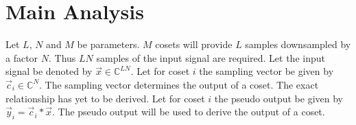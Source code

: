 \documentclass[a4paper, openany, oneside]{memoir}
\begin{document}
\section{Main Analysis}

Let $L$, $N$ and $M$ be parameters. $M$ cosets will provide $L$ samples downsampled by a factor $N$. Thus $LN$ samples of the input signal are required. Let the input signal be denoted by $\vec{x} \in \mathbb{C}^{LN}$. Let for coset $i$ the sampling vector be given by $\vec{c}_i \in \mathbb{C}^{N}$. The sampling vector determines the output of a coset. The exact relationship has yet to be derived. Let for coset $i$ the pseudo output be given by $\vec{y}_i = \vec{c}_i \ast \vec{x}$. The pseudo output will be used to derive the output of a coset.

\begin{blockTheorem} \label{th:conv-corr}
     \nolinebreak
\end{blockTheorem}
\end{document}
